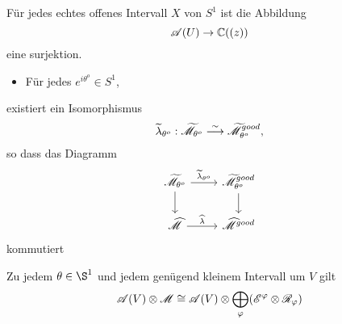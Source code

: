 \begin{comment}
  Damit bekommt man die Garbe $\cA$ auf $S^1$, die zu einem offenem Intervall
  $U$ von $S^1$ die Menge $\cA(U)$ der Funktionen mit asymptotischer
  Entwicklung auf dem entsprechendem Sektor zuordnet.

  \TODO[The sheaf $\sA$]
\end{comment}

\begin{lem}
  Für jedes echtes offenes Intervall $X$ von $S^1$ ist die Abbildung
  \[
    \mathscr{A}(U)\to \mathbb{C}((z))
  \]
  eine surjektion.
\end{lem}
\begin{paracol}{2} %
  \begin{thm}
    \begin{itemize}
      \item Für jedes $e^{i\theta^o}\in S^1$,
    \end{itemize}
    existiert ein Isomorphismus
    \[
      \widetilde\lambda_{\theta^o}: \widetilde{\mathscr{M}}_{\theta^o}
      \overset{\sim}{\longrightarrow}\widetilde{\mathscr{M}}^{good}_{\theta^o},
    \]
    so dass das Diagramm
    \[ \begin{tikzcd}
        \tilde\sM_{\theta^o} \dar \rar{\tilde\lambda_{\theta^o}} &
        \tilde\sM^{good}_{\theta^o} \dar
        \\\hat\sM \rar{\hat\lambda} &
        \hat\sM^{good}
    \end{tikzcd} \]
    kommutiert
  \end{thm}
\switchcolumn %
\begin{thm}
  Zu jedem $\theta\in\S^1$ und jedem genügend kleinem Intervall um $V$ gilt
  \[
    \mathscr{A}(V)\otimes\mathscr{M}\cong\mathscr{A}(V)\otimes\bigoplus_\varphi(\mathscr{E}^\varphi\otimes\mathscr{R}_\varphi)
  \]
\end{thm}
\end{paracol} %
